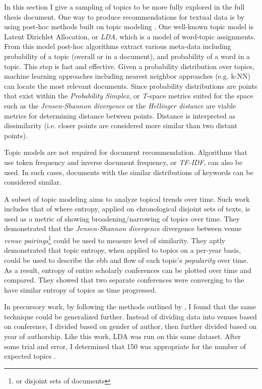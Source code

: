 In this section I give a sampling of topics to be more fully explored in the full thesis document.
One way to produce recommendations for textual data is by using post-hoc methods built on topic modeling \citep{blei2012probabilistic}. One well-known topic model is Latent Dirichlet Allocation, or \emph{LDA}, which is a model of word-topic assignments. From this model post-hoc algorithms extract various meta-data including probability of a topic (overall or in a document), and probability of a word in a topic. This step is fast and effective. Given a probability distribution over topics, machine learning approaches including nearest neighbor approaches (e.g. k-NN) can locate the most relevant documents. Since probability distributions are points that exist within the \textit{Probability Simplex}, or \emph{T}-space \citep{Krstovski2013efficient} metrics suited for the space such as the \emph{Jensen-Shannon divergence} or the \emph{Hellinger distance} are viable metrics for determining distance between points. Distance is interpreted as dissimilarity (i.e. closer points are considered more similar than two distant points).

Topic models are not required for document recommendation. Algorithms that use token frequency and inverse document frequency, or \emph{TF-IDF}, can also be used. In such cases, documents with the similar distributions of keywords can be considered similar.

A subset of topic modeling aims to analyze topical trends over time. Such work includes that of \citep{hall-jurafsky-manning:2008:EMNLP} where entropy, applied on chronological disjoint sets of texts, is used as a metric of showing broadening/narrowing of topics over time. They demonstrated that the \emph{Jensen-Shannon divergence} divergence between venue \emph{venue pairings}\footnote{or disjoint sets of documents} could be used to measure level of similarity. They aptly demonstrated that topic entropy, when applied to topics on a per-year basis, could be used to describe the ebb and flow of each topic’s \emph{popularity} over time. As a result, entropy of entire scholarly conferences can be plotted over time and compared. They showed that two separate conferences were converging to the have similar entropy of topics as time progressed.

In precursory work, by following the methods outlined by \cite{hall-jurafsky-manning:2008:EMNLP}, I found that the same technique could be generalized further. Instead of dividing data into venues based on conference, I divided based on gender of author, then further divided based on year of authorship. Like this work, LDA was run on this same dataset. After some trial and error, I determined that 150 was appropriate for the number of expected topics \citep{bean5-LDA-ToT}.%

